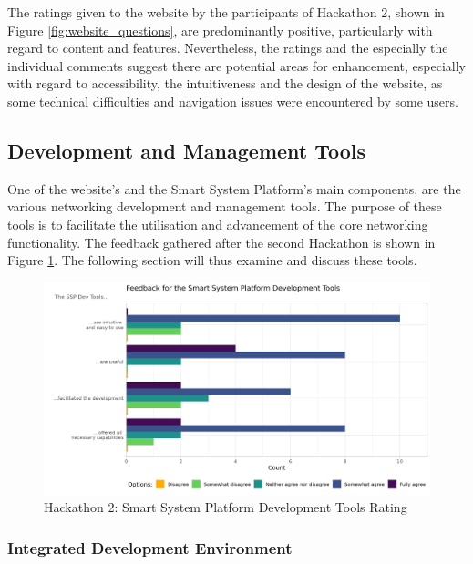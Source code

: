 The ratings given to the website by the participants of Hackathon 2, shown in Figure \ref{fig:website_questions}, are predominantly positive, particularly with regard to content and features. Nevertheless, the ratings and the especially the individual comments suggest there are potential areas for enhancement, especially with regard to accessibility, the intuitiveness and the design of the website, as some technical difficulties and navigation issues were encountered by some users.

\subsection{\label{sec:res_tools}Development and Management Tools}

One of the website's and the Smart System Platform's main components, are the various networking development and management tools. The purpose of these tools is to facilitate the utilisation and advancement of the core networking functionality. The feedback gathered after the second Hackathon is shown in Figure \ref{fig:hack2_tools}. The following section will thus examine and discuss these tools.

\begin{figure}[H]
    \centering
    \includegraphics[width=\linewidth]{rstudio/survey/plots/ssp2.png}
    \vspace{.03\ftspace}
    \caption{Hackathon 2: Smart System Platform Development Tools Rating}
    \label{fig:hack2_tools}
\end{figure}

\subsubsection{\label{sec:res_ide}Integrated Development Environment}

